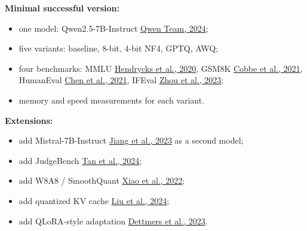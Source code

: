 \documentclass[11pt,a4paper]{article}
\newcommand{\cit}[2]{\href{https://arxiv.org/abs/#2}{#1}}
\begin{document}
\textbf{Minimal successful version:}
\begin{itemize}
    \item one model: Qwen2.5-7B-Instruct \cit{Qwen Team, 2024}{2412.15115};
    \item five variants: baseline, 8-bit, 4-bit NF4, GPTQ, AWQ;
    \item four benchmarks: MMLU \cit{Hendrycks et al., 2020}{2009.03300}, GSM8K \cit{Cobbe et al., 2021}{2110.14168}, HumanEval \cit{Chen et al., 2021}{2107.03374}, IFEval \cit{Zhou et al., 2023}{2311.07911};
    \item memory and speed measurements for each variant.
\end{itemize}

\textbf{Extensions:}
\begin{itemize}
    \item add Mistral-7B-Instruct \cit{Jiang et al., 2023}{2310.06825} as a second model;
    \item add JudgeBench \cit{Tan et al., 2024}{2410.12784};
    \item add W8A8 / SmoothQuant \cit{Xiao et al., 2022}{2211.10438};
    \item add quantized KV cache \cit{Liu et al., 2024}{2402.02750};
    \item add QLoRA-style adaptation \cit{Dettmers et al., 2023}{2305.14314}.
\end{itemize}
\end{document}
